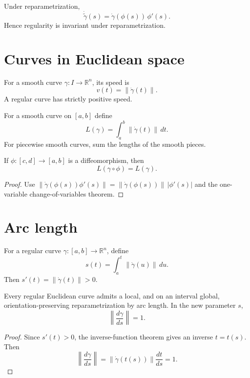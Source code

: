 \begin{proposition}\label{prop:vii12-velocity-transform}
Under reparametrization,
\[
\dot{\widetilde\gamma}(s)=\dot\gamma(\phi(s))\,\phi'(s).
\]
Hence regularity is invariant under reparametrization.
\end{proposition}

\section{Curves in Euclidean space}
\begin{definition}[Speed]\label{def:vii12-speed}
For a smooth curve $\gamma:I\to\mathbb R^n$, its speed is
\[
v(t)=\|\dot\gamma(t)\|.
\]
A regular curve has strictly positive speed.
\end{definition}

\begin{definition}[Length]\label{def:vii12-length}
For a smooth curve on $[a,b]$ define
\[
L(\gamma)=\int_a^b\|\dot\gamma(t)\|\,dt.
\]
For piecewise smooth curves, sum the lengths of the smooth pieces.
\end{definition}

\begin{theorem}\label{thm:vii12-length-invariant}
If $\phi:[c,d]\to[a,b]$ is a diffeomorphism, then
\[
L(\gamma\circ\phi)=L(\gamma).
\]
\end{theorem}
\begin{proof}
Use $\|\dot\gamma(\phi(s))\phi'(s)\|=\|\dot\gamma(\phi(s))\|\,|\phi'(s)|$ and the one-variable change-of-variables theorem.
\end{proof}

\section{Arc length}
\begin{definition}\label{def:vii12-arclength-function}
For a regular curve $\gamma:[a,b]\to\mathbb R^n$, define
\[
s(t)=\int_a^t\|\dot\gamma(u)\|\,du.
\]
Then $s'(t)=\|\dot\gamma(t)\|>0$.
\end{definition}

\begin{theorem}\label{thm:vii12-unit-speed}
Every regular Euclidean curve admits a local, and on an interval global, orientation-preserving reparametrization by arc length. In the new parameter $s$,
\[
\left\|\frac{d\gamma}{ds}\right\|=1.
\]
\end{theorem}
\begin{proof}
Since $s'(t)>0$, the inverse-function theorem gives an inverse $t=t(s)$. Then
\[
\left\|\frac{d\gamma}{ds}\right\|=\|\dot\gamma(t(s))\|\frac{dt}{ds}=1.
\]
\end{proof}

